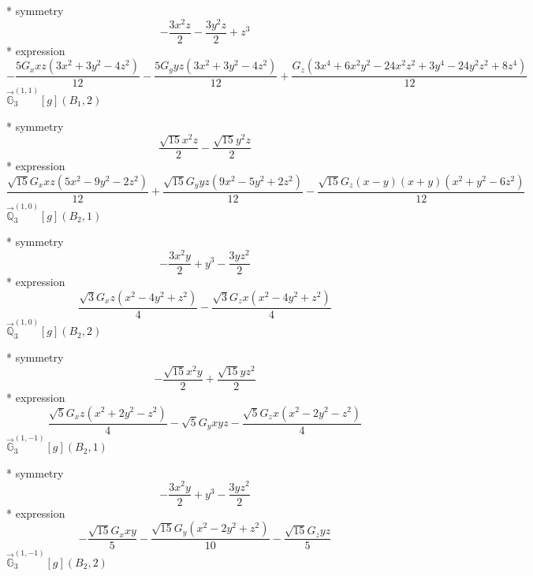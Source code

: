 \documentclass[fleqn,8pt]{jsarticle}
\begin{document}
\noindent\quad ** symmetry
\begin{dmath*}
- \frac{3 x^{2} z}{2} - \frac{3 y^{2} z}{2} + z^{3}
\end{dmath*}
\noindent\quad ** expression
\begin{dmath*}
- \frac{5 G_{x} x z \left(3 x^{2} + 3 y^{2} - 4 z^{2}\right)}{12} - \frac{5 G_{y} y z \left(3 x^{2} + 3 y^{2} - 4 z^{2}\right)}{12} + \frac{G_{z} \left(3 x^{4} + 6 x^{2} y^{2} - 24 x^{2} z^{2} + 3 y^{4} - 24 y^{2} z^{2} + 8 z^{4}\right)}{12}
\end{dmath*}
\noindent\quad $\vec{\mathbb{G}}_{3}^{(1,1)}[g](B_{1},2)$

\noindent\quad ** symmetry
\begin{dmath*}
\frac{\sqrt{15} x^{2} z}{2} - \frac{\sqrt{15} y^{2} z}{2}
\end{dmath*}
\noindent\quad ** expression
\begin{dmath*}
\frac{\sqrt{15} G_{x} x z \left(5 x^{2} - 9 y^{2} - 2 z^{2}\right)}{12} + \frac{\sqrt{15} G_{y} y z \left(9 x^{2} - 5 y^{2} + 2 z^{2}\right)}{12} - \frac{\sqrt{15} G_{z} \left(x - y\right) \left(x + y\right) \left(x^{2} + y^{2} - 6 z^{2}\right)}{12}
\end{dmath*}
\noindent\quad $\vec{\mathbb{Q}}_{3}^{(1,0)}[g](B_{2},1)$

\noindent\quad ** symmetry
\begin{dmath*}
- \frac{3 x^{2} y}{2} + y^{3} - \frac{3 y z^{2}}{2}
\end{dmath*}
\noindent\quad ** expression
\begin{dmath*}
\frac{\sqrt{3} G_{x} z \left(x^{2} - 4 y^{2} + z^{2}\right)}{4} - \frac{\sqrt{3} G_{z} x \left(x^{2} - 4 y^{2} + z^{2}\right)}{4}
\end{dmath*}
\noindent\quad $\vec{\mathbb{Q}}_{3}^{(1,0)}[g](B_{2},2)$

\noindent\quad ** symmetry
\begin{dmath*}
- \frac{\sqrt{15} x^{2} y}{2} + \frac{\sqrt{15} y z^{2}}{2}
\end{dmath*}
\noindent\quad ** expression
\begin{dmath*}
\frac{\sqrt{5} G_{x} z \left(x^{2} + 2 y^{2} - z^{2}\right)}{4} - \sqrt{5} G_{y} x y z - \frac{\sqrt{5} G_{z} x \left(x^{2} - 2 y^{2} - z^{2}\right)}{4}
\end{dmath*}
\noindent\quad $\vec{\mathbb{G}}_{3}^{(1,-1)}[g](B_{2},1)$

\noindent\quad ** symmetry
\begin{dmath*}
- \frac{3 x^{2} y}{2} + y^{3} - \frac{3 y z^{2}}{2}
\end{dmath*}
\noindent\quad ** expression
\begin{dmath*}
- \frac{\sqrt{15} G_{x} x y}{5} - \frac{\sqrt{15} G_{y} \left(x^{2} - 2 y^{2} + z^{2}\right)}{10} - \frac{\sqrt{15} G_{z} y z}{5}
\end{dmath*}
\noindent\quad $\vec{\mathbb{G}}_{3}^{(1,-1)}[g](B_{2},2)$
\end{document}
